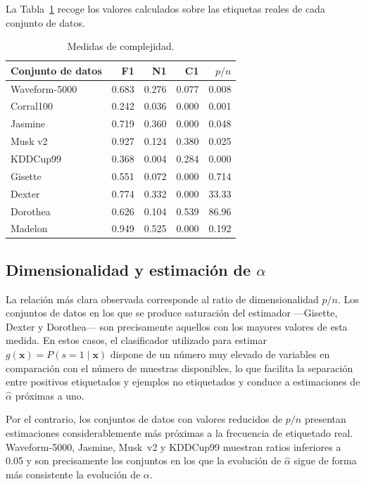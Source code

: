 La Tabla~\ref{tab:complejidad} recoge los valores calculados sobre las etiquetas reales de cada conjunto de datos.

\begin{table}[ht]
\centering
\caption{Medidas de complejidad.}
\label{tab:complejidad}
\small
\begin{tabular}{lrrrr}
\toprule
\textbf{Conjunto de datos} & \textbf{F1} & \textbf{N1} & \textbf{C1} & $p/n$ \\
\midrule
Waveform-5000 & 0.683 & 0.276 & 0.077 & 0.008 \\
Corral100     & 0.242 & 0.036 & 0.000 & 0.001 \\
Jasmine       & 0.719 & 0.360 & 0.000 & 0.048 \\
Musk v2       & 0.927 & 0.124 & 0.380 & 0.025 \\
KDDCup99      & 0.368 & 0.004 & 0.284 & 0.000 \\
\midrule
Gisette       & 0.551 & 0.072 & 0.000 & 0.714 \\
Dexter        & 0.774 & 0.332 & 0.000 & 33.33 \\
Dorothea      & 0.626 & 0.104 & 0.539 & 86.96 \\
Madelon       & 0.949 & 0.525 & 0.000 & 0.192 \\
\bottomrule
\end{tabular}
\end{table}

\subsection{Dimensionalidad y estimación de \texorpdfstring{$\alpha$}{alpha}}
\label{subsec:complejidad_alpha}

La relación más clara observada corresponde al ratio de dimensionalidad $p/n$. Los conjuntos de datos en los que se produce saturación del estimador —Gisette, Dexter y Dorothea— son precisamente aquellos con los mayores valores de esta medida. En estos casos, el clasificador utilizado para estimar $g(\mathbf{x})=P(s=1 \mid \mathbf{x})$ dispone de un número muy elevado de variables en comparación con el número de muestras disponibles, lo que facilita la separación entre positivos etiquetados y ejemplos no etiquetados y conduce a estimaciones de $\hat{\alpha}$ próximas a uno.

Por el contrario, los conjuntos de datos con valores reducidos de $p/n$ presentan estimaciones considerablemente más próximas a la frecuencia de etiquetado real. Waveform-5000, Jasmine, Musk~v2 y KDDCup99 muestran ratios inferiores a 0.05 y son precisamente los conjuntos en los que la evolución de $\hat{\alpha}$ sigue de forma más consistente la evolución de $\alpha$.


